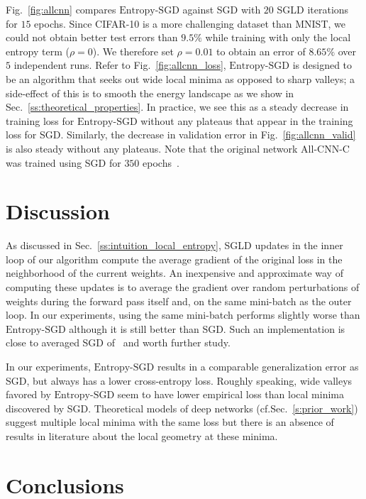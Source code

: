 \documentclass[10pt]{article}
\newcommand{\entropysgd}{\mathrm{Entropy}\textrm{-}\mathrm{SGD}}
\begin{document}
Fig.~\ref{fig:allcnn} compares $\entropysgd$ against SGD with $20$ SGLD iterations for $15$ epochs. Since CIFAR-10 is a more challenging dataset than MNIST, we could not obtain better test errors than $9.5\%$ while training with only the local entropy term ($\rho = 0$). We therefore set $\rho = 0.01$ to obtain an error of $8.65\%$ over $5$ independent runs. Refer to Fig.~\ref{fig:allcnn_loss}, $\entropysgd$ is designed to be an algorithm that seeks out wide local minima as opposed to sharp valleys; a side-effect of this is to smooth the energy landscape as we show in Sec.~\ref{ss:theoretical_properties}. In practice, we see this as a steady decrease in training loss for $\entropysgd$ without any plateaus that appear in the training loss for SGD. Similarly, the decrease in validation error in Fig.~\ref{fig:allcnn_valid} is also steady without any plateaus. Note that the original network $\textrm{All-CNN-C}$ was trained using SGD for $350$ epochs~\citep{springenberg2014striving}.

\section{Discussion}
\label{s:discussion}

As discussed in Sec.~\ref{ss:intuition_local_entropy}, SGLD updates in the inner loop of our algorithm compute the average gradient of the original loss in the neighborhood of the current weights. An inexpensive and approximate way of computing these updates is to average the gradient over random perturbations of weights during the forward pass itself and, on the same mini-batch as the outer loop. In our experiments, using the same mini-batch performs slightly worse than $\entropysgd$ although it is still better than SGD. Such an implementation is close to averaged SGD of~\citep{polyak1992acceleration,bottou2012stochastic} and worth further study.

In our experiments, $\entropysgd$ results in a comparable generalization error as SGD, but always has a lower cross-entropy loss. Roughly speaking, wide valleys favored by $\entropysgd$ seem to have lower empirical loss than local minima discovered by SGD. Theoretical models of deep networks (cf.\@ Sec.~\ref{s:prior_work}) suggest multiple local minima with the same loss but there is an absence of results in literature about the local geometry at these minima.

\section{Conclusions}
\label{s:conclusions}
\end{document}
